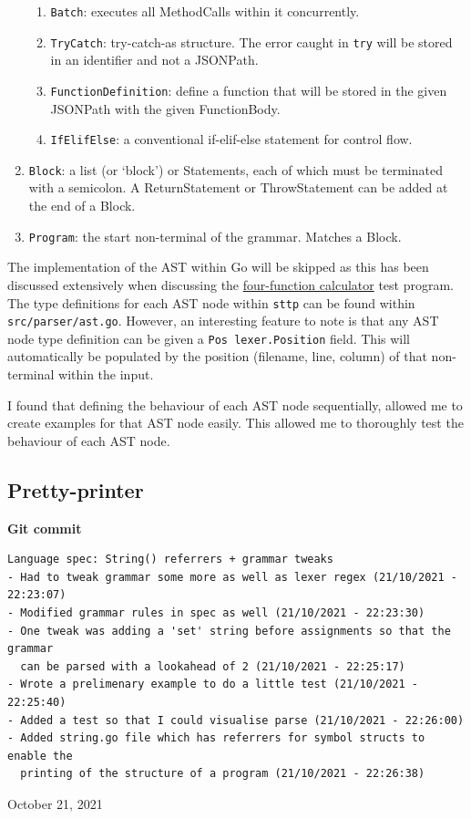 \documentclass[]{full}
\theoremstyle{definition}
\begin{document}
\begin{enumerate}
\begin{enumerate}
        \item \verb|Batch|: executes all MethodCalls within it concurrently.
        \item \verb|TryCatch|: try-catch-as structure. The error caught in \verb|try| will be stored in an identifier and not a JSONPath.
        \item \verb|FunctionDefinition|: define a function that will be stored in the given JSONPath with the given FunctionBody.
        \item \verb|IfElifElse|: a conventional if-elif-else statement for control flow.
    \end{enumerate}
    \item \verb|Block|: a list (or `block') or Statements, each of which must be terminated with a semicolon. A ReturnStatement or ThrowStatement can be added at the end of a Block.
    \item \verb|Program|: the start non-terminal of the grammar. Matches a Block.
\end{enumerate}

The implementation of the AST within Go will be skipped as this has been discussed extensively when discussing the \hyperref[sec:four-function-calc]{four-function calculator} test program. The type definitions for each AST node within \verb|sttp| can be found within \verb|src/parser/ast.go|. However, an interesting feature to note is that any AST node type definition can be given a \verb|Pos lexer.Position| field. This will automatically be populated by the position (filename, line, column) of that non-terminal within the input.

I found that defining the behaviour of each AST node sequentially, allowed me to create examples for that AST node easily. This allowed me to thoroughly test the behaviour of each AST node.

\subsection{Pretty-printer}

\begin{center}
    \textbf{Git commit}
    \begin{verbatim}
Language spec: String() referrers + grammar tweaks
- Had to tweak grammar some more as well as lexer regex (21/10/2021 - 22:23:07)
- Modified grammar rules in spec as well (21/10/2021 - 22:23:30)
- One tweak was adding a 'set' string before assignments so that the grammar
  can be parsed with a lookahead of 2 (21/10/2021 - 22:25:17)
- Wrote a prelimenary example to do a little test (21/10/2021 - 22:25:40)
- Added a test so that I could visualise parse (21/10/2021 - 22:26:00)
- Added string.go file which has referrers for symbol structs to enable the
  printing of the structure of a program (21/10/2021 - 22:26:38)
    \end{verbatim}
    \vspace{-1em}
    \tiny{October 21, 2021}
\end{center}
\end{document}
